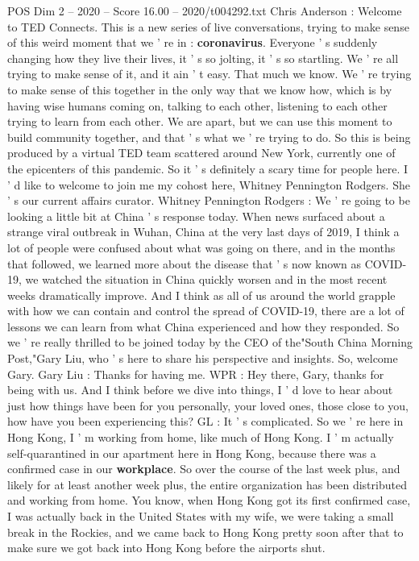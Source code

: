 \begin{textsample}{POS Dim 2 – 2020 – Score 16.00 – 2020/t004292.txt}  \label{ex:f2_pos_015}
Chris Anderson : Welcome to TED Connects.
This is a new series of live conversations, trying to make sense of this weird moment that we ' re in : \textbf{coronavirus}.
Everyone ' s suddenly changing how they live their lives, it ' s so jolting, it ' s so startling.
We ' re all trying to make sense of it, and it ain ' t easy.
That much we know.
We ' re trying to make sense of this together in the only way that we know how, which is by having wise humans coming on, talking to each other, listening to each other trying to learn from each other.
We are apart, but we can use this moment to build community together, and that ' s what we ' re trying to do.
So this is being produced by a virtual TED team scattered around New York, currently one of the epicenters of this pandemic.
So it ' s definitely a scary time for people here.
I ' d like to welcome to join me my cohost here, Whitney Pennington Rodgers.
She ' s our current affairs curator.
Whitney Pennington Rodgers : We ' re going to be looking a little bit at China ' s response today.
When news surfaced about a strange viral outbreak in Wuhan, China at the very last days of 2019, I think a lot of people were confused about what was going on there, and in the months that followed, we learned more about the disease that ' s now known as COVID-19, we watched the situation in China quickly worsen and in the most recent weeks dramatically improve.
And I think as all of us around the world grapple with how we can contain and control the spread of COVID-19, there are a lot of lessons we can learn from what China experienced and how they responded.
So we ' re really thrilled to be joined today by the CEO of the"South China Morning Post,"Gary Liu, who ' s here to share his perspective and insights.
So, welcome Gary.
Gary Liu : Thanks for having me.
WPR : Hey there, Gary, thanks for being with us.
And I think before we dive into things, I ' d love to hear about just how things have been for you personally, your loved ones, those close to you, how have you been experiencing this?
GL : It ' s complicated.
So we ' re here in Hong Kong, I ' m working from home, like much of Hong Kong.
I ' m actually self-quarantined in our apartment here in Hong Kong, because there was a confirmed case in our \textbf{workplace}.
So over the course of the last week plus, and likely for at least another week plus, the entire organization has been distributed and working from home.
You know, when Hong Kong got its first confirmed case, I was actually back in the United States with my wife, we were taking a small break in the Rockies, and we came back to Hong Kong pretty soon after that to make sure we got back into Hong Kong before the airports shut.

\end{textsample}
